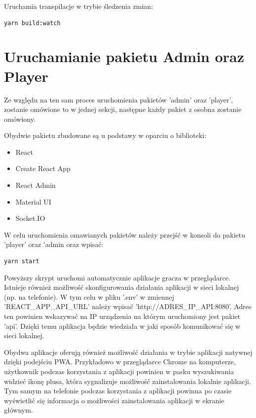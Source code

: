 Uruchamia transpilacje w trybie śledzenia zmian:
\begin{lstlisting}
yarn build:watch
\end{lstlisting}

\section{Uruchamianie pakietu Admin oraz Player}
Ze względu na ten sam proces uruchomienia pakietów 'admin' oraz 'player', zostanie omówione to w jednej sekcji, następne każdy pakiet z osobna zostanie omówiony.

Obydwie pakietu zbudowane są u podstawy w oparciu o biblioteki:

\begin{itemize}
    \item React
	\item Create React App
	\item React Admin
	\item Material UI
	\item Socket.IO
\end{itemize}


W celu uruchomienia omawianych pakietów należy przejść w konsoli do pakietu 'player' oraz 'admin oraz wpisać:

\begin{lstlisting}
yarn start
\end{lstlisting}

Powyższy skrypt uruchomi automatycznie aplikacje gracza w przeglądarce. Istnieje również możliwość skonfigurowania działania aplikacji w sieci lokalnej (np. na telefonie). W tym celu w pliku '.env' w zmiennej 'REACT\_APP\_API\_URL' należy wpisać 'http://{ADRES\_IP\_API}:8080'. Adres ten powinien wskazywać na IP urządzenia na którym uruchomiony jest pakiet 'api'. Dzięki temu aplikacja będzie wiedziała w jaki sposób komunikować się w sieci lokalnej.

Obydwa aplikacje oferują również możliwość działania w trybie aplikacji natywnej dzięki podejściu PWA. Przykładowo w przeglądarce Chrome na komputerze, użytkownik podczas korzystania z aplikacji powinien w pasku wyszukiwania widzieć ikonę plusa, która sygnalizuje możliwość zainstalowania lokalnie aplikacji. Tym samym na telefonie podczas korzystania z aplikacji powinna po czasie wyświetlić się informacja o możliwości zainstalowania aplikacji w ekranie głównym.

